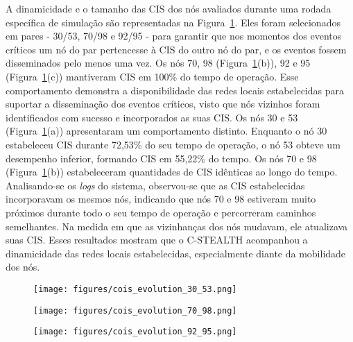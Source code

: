 \documentclass[12pt]{article}
\begin{document}
A dinamicidade e o tamanho das CIS dos nós avaliados durante uma rodada específica de simulação são representadas na Figura~\ref{fig:cois_evolution}. Eles foram selecionados em pares - 30/53, 70/98 e 92/95 - para garantir que nos momentos dos eventos críticos um nó do par pertencesse à CIS do outro nó do par, e os eventos fossem disseminados pelo menos uma vez. Os nós 70, 98 (Figura~\ref{fig:cois_evolution}(b)), 92 e 95 (Figura~\ref{fig:cois_evolution}(c)) mantiveram CIS em 100\% do tempo de operação. Esse comportamento demonstra
a disponibilidade
das
redes locais estabelecidas
para suportar a disseminação dos eventos críticos, visto que nós vizinhos foram identificados com sucesso e incorporados as suas CIS. Os nós 30 e 53 (Figura~\ref{fig:cois_evolution}(a)) apresentaram um comportamento distinto. Enquanto o nó 30 estabeleceu CIS durante 72,53\% do seu tempo de operação, o nó 53 obteve um desempenho inferior, formando CIS em 55,22\% do tempo. Os nós 70 e 98 (Figura~\ref{fig:cois_evolution}(b)) estabeleceram quantidades de CIS idênticas ao longo do tempo. Analisando-se os \textit{logs} do sistema, observou-se que as CIS estabelecidas incorporavam os mesmos nós, indicando que nós 70 e 98 estiveram muito próximos durante todo o seu tempo de operação e percorreram caminhos semelhantes. Na medida em que as vizinhanças dos nós mudavam, ele atualizava suas CIS. Esses resultados mostram que o \mbox{C-STEALTH} acompanhou a dinamicidade das redes locais estabelecidas, especialmente diante da mobilidade dos nós. 

\begin{figure}[H]
\vspace{-0.2cm}
	\begin{minipage}[t]{0.32\linewidth}
		\texttt{[image: figures/cois\_evolution\_30\_53.png]}
		\vspace{-25.0pt}
	\end{minipage}
	\begin{minipage}[t]{0.32\linewidth}
		\texttt{[image: figures/cois\_evolution\_70\_98.png]}
		\vspace{-10.0pt}
	\end{minipage}
	\begin{minipage}[t]{0.32\linewidth}
		\texttt{[image: figures/cois\_evolution\_92\_95.png]}
		\vspace{-25.0pt}
	\end{minipage}
	\vspace{-8.0pt}
	\label{fig:cois_evolution}
	\vspace{-0.5cm}
\end{figure}
\end{document}
